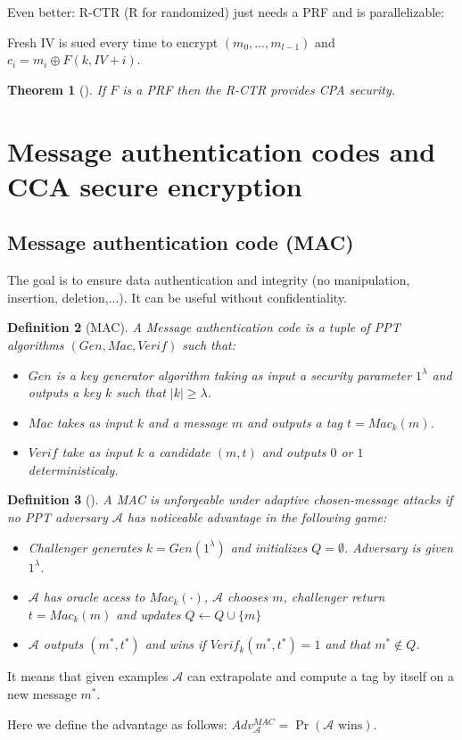 \documentclass{article}
\newtheorem{thm}{Theorem}[section]
\newtheorem{defi}[thm]{Definition}
\newcommand{\Thm}[3]{\begin{thm}[#1]\label{#2}#3\end{thm}}
\newcommand{\Def}[3]{\begin{defi}[#1]\label{#2}#3\end{defi}}
\newcommand{\A}{\mathcal{A}}
\begin{document}
Even better: R-CTR (R for randomized) just needs a PRF and is parallelizable:

Fresh IV is sued every time to encrypt $(m_0,...,m_{l-1})$ and $c_i=m_i\oplus F(k,IV+i)$.

\Thm{}{def:RCTRsecure}{If $F$ is a PRF then the R-CTR provides CPA security.}

\section{Message authentication codes and CCA secure encryption}
\subsection{Message authentication code (MAC)}
The goal is to ensure data authentication and integrity (no manipulation, insertion, deletion,...). It can be useful without confidentiality.

\Def{MAC}{def:MAC}{A Message authentication code is a tuple of PPT algorithms $(Gen,Mac,Verif)$ such that:\begin{itemize}
\item $Gen$ is a key generator algorithm taking as input a security parameter $1^\lambda$ and outputs a key $k$ such that $|k|\geq\lambda$.
\item $Mac$ takes as input $k$ and a message $m$ and outputs a tag $t=Mac_k(m)$.
\item $Verif$ take as input $k$ a candidate $(m,t)$ and outputs $0$ or $1$ deterministicaly.
\end{itemize}}

\Def{}{def:unforgeadapt}{A MAC is unforgeable under adaptive chosen-message attacks if no PPT adversary $\A$ has noticeable advantage in the following game:\begin{itemize}
\item Challenger generates $k=Gen(1^\lambda)$ and initializes $Q=\emptyset$. Adversary is given $1^\lambda$.
\item $\A$ has oracle acess to $Mac_k(\cdot)$, $\A$ chooses $m$, challenger return $t=Mac_k(m)$ and updates $Q\leftarrow Q\cup\{m\}$
\item $\A$ outputs $(m^*,t^*)$ and wins if $Verif_k(m^*,t^*)=1$ and that $m^*\notin Q$.
\end{itemize}}

It means that given examples $\A$ can extrapolate and compute a tag by itself on a new message $m^*$.

Here we define the advantage as follows: $Adv_\A^{MAC}=\Pr(\A\text{ wins})$.
\end{document}
